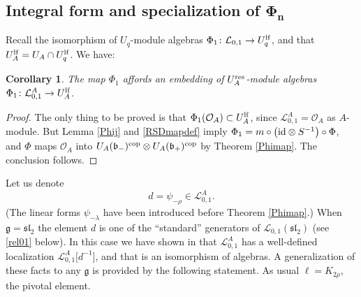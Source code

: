 \documentclass[10pt,a4paper]{amsart}
\numberwithin{equation}{section}
\newtheorem{cor}[teo]{Corollary}
\theoremstyle{definition}
\newcommand{\Ll}{{\mathcal L}}
\newcommand{\Oo}{{\mathcal O}}
\newcommand{\ra}{\rightarrow}
\begin{document}
\subsection[Integral form and specialization of Phi\_n]{Integral form and specialization of $\boldsymbol{\Phi_n}$}\label{INTPHIn}
Recall the isomorphism of $U_q$-module algebras $\Phi_1\colon \Ll_{0,1} \ra U_q^{\rm lf}$, and that $U_A^{\rm lf} = U_A\cap U_q^{\rm lf}$. We have:

\begin{cor}\label{Phi1int} The map $\Phi_1$ affords an embedding of $U_A^{\rm res}$-module algebras $\Phi_1\colon \Ll_{0,1}^A \ra U_A^{\rm lf}$.
\end{cor}
\begin{proof} The only thing to be proved is that $\Phi_1(\Oo_A) \subset U_A^{\rm lf}$, since $\Ll_{0,1}^A = \Oo_A$ as $A$-module. But Lemma \ref{Phij} and \eqref{RSDmapdef} imply $\Phi_1 = m\circ \big({\rm id}\otimes S^{-1}\big)\circ \Phi$, and $\Phi$ maps $\Oo_A$ into $U_A(\mathfrak{b}_-)^{\rm cop}\otimes U_A(\mathfrak{b}_+)^{\rm cop}$ by Theorem \ref{Phimap}. The conclusion follows.
 \end{proof}

Let us denote
\[d=\psi_{-\rho}\in \Ll_{0,1}^A.\]
(The linear forms $\psi_{-\lambda}$ have been introduced before Theorem \ref{Phimap}.) When $\mathfrak{g}={\mathfrak{sl}_2}$ the element $d$ is one of the ``standard'' generators of $\Ll_{0,1}({\mathfrak{sl}_2})$ (see \eqref{rel01} below). In this case we have shown in \cite[Lemma 5.7]{BR} that $\Ll_{0,1}^A$ has a well-defined localization $\Ll_{0,1}^A\big[d^{-1}\big]$, and that \smash{$\Phi_1\colon \Ll_{0,1}^A\big[d^{-1}\big] \ra U_A^{\rm ad}=T_{2-}^{-1}U_A^{\rm lf}$} is an isomorphism of algebras. A generalization of these facts to any $\mathfrak{g}$ is provided by the following statement. As usual $\ell=K_{2\rho}$, the pivotal element.
\end{document}
